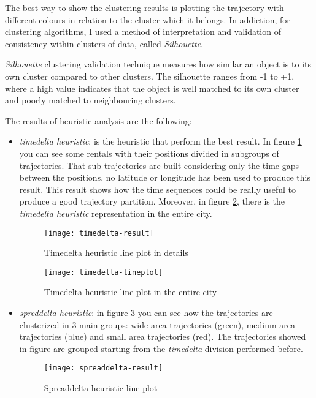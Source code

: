 The best way to show the clustering results is plotting the trajectory with different colours in relation to the cluster which it belongs. In addiction, for clustering algorithms, I used a method of interpretation and validation of consistency within clusters of data, called \textit{Silhouette}. 

\textit{Silhouette} clustering validation technique measures how similar an object is to its own cluster compared to other clusters. The silhouette ranges from -1 to +1, where a high value indicates that the object is well matched to its own cluster and poorly matched to neighbouring clusters.

The results of heuristic analysis are the following: 
\begin{itemize}
	\item \textit{timedelta heuristic}: is the heuristic that perform the best result. In figure \ref{fig:timedelta-result} you can see some rentals with their positions divided in subgroups of trajectories. That sub trajectories are built considering only the time gaps between the positions, no latitude or longitude has been used to produce this result. This result shows how the time sequences could be really useful to produce a good trajectory partition. Moreover, in figure \ref{fig:timedelta-lineplot}, there is the \textit{timedelta heuristic} representation in the entire city.
	
	\begin{figure}[bt]
		\centering
		\texttt{[image: timedelta-result]}
		\caption{Timedelta heuristic line plot in details}
		\label{fig:timedelta-result}
	\end{figure}

	\begin{figure}[bt]
		\centering
		\texttt{[image: timedelta-lineplot]}
		\caption{Timedelta heuristic line plot in the entire city}
		\label{fig:timedelta-lineplot}
	\end{figure}

	\item \textit{spreddelta heuristic}: in figure \ref{fig:spreaddelta-result} you can see how the trajectories are clusterized in 3 main groups: wide area trajectories (green), medium area trajectories (blue) and small area trajectories (red). The trajectories showed in figure are grouped starting from the \textit{timedelta} division performed before. 
	
	\begin{figure}[bt]
		\centering
		\texttt{[image: spreaddelta-result]}
		\caption{Spreaddelta heuristic line plot}
		\label{fig:spreaddelta-result}
	\end{figure}
	

\end{itemize}
